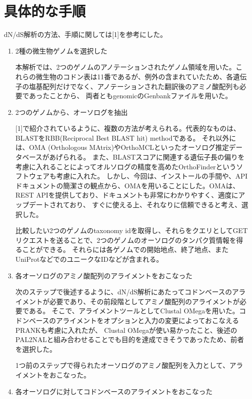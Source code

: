 \documentclass[a4j,12pt]{jreport}
\begin{document}
\section{具体的な手順}
    dN/dS解析の方法、手順に関しては[1]を参考にした。
    \begin{enumerate}
        \item 2種の微生物ゲノムを選択した

        本解析では、2つのゲノムのアノテーションされたゲノム領域を用いた。これらの微生物のコドン表は11番であるが、例外の含まれていたため、各遺伝子の塩基配列だけでなく、アノテーションされた翻訳後のアミノ酸配列も必要であったことから、
        両者ともgenomicのGenbankファイルを用いた。
        \item 2つのゲノムから、オーソログを抽出
        
        [1]で紹介されているように、複数の方法が考えられる。代表的なものは、BLASTをRBB(Reciprocal Best BLAST hit) methodである。
        それ以外には、OMA (Orthologous MAtrix)やOrthoMCLといったオーソログ推定データベースがあげられる。
        また、BLASTスコアに関連する遺伝子長の偏りを考慮に入れることによってオルソログの精度を高めたOrthoFinderというソフトウェアも考慮に入れた。
        しかし、今回は、インストールの手間や、APIドキュメントの簡潔さの観点から、OMAを用いることにした。OMAは、REST APIを提供しており、ドキュメントも非常にわかりやすく、適度にアップデートされており、
        すぐに使える上、それなりに信頼できると考え、選択した。

        比較したい2つのゲノムのtaxonomy idを取得し、それらをクエリとしてGETリクエストを送ることで、2つのゲノムのオーソログのタンパク質情報を得ることができる。
        それらには各ゲノムでの開始地点、終了地点、またUniProtなどでのユニークなIDなどが含まれる。
        
        \item 各オーソログのアミノ酸配列のアライメントをおこなった
        
        次のステップで後述するように、dN/dS解析にあたってコドンベースのアライメントが必要であり、その前段階としてアミノ酸配列のアライメントが必要である。
        そこで、アライメントツールとしてClustal OMegaを用いた。コドンベースのアライメントをオプションと入力の変更によっておこなえるPRANKも考慮に入れたが、
        Clustal OMegaが使い易かったこと、後述のPAL2NALと組み合わせることでも目的を達成できそうであったため、前者を選択した。

        1つ前のステップで得られたオーソログのアミノ酸配列を入力として、アライメントをおこなった。

        \item 各オーソログに対してコドンベースのアライメントをおこなった
        

\end{enumerate}
\end{document}
